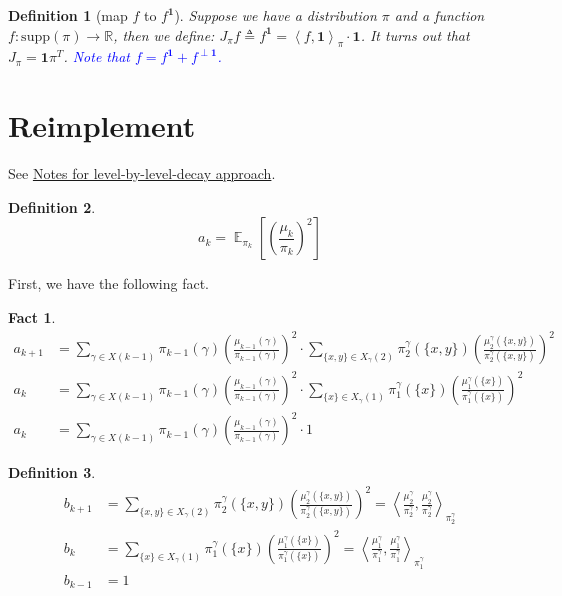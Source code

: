 \documentclass{article}
\newtheorem{define}{Definition}[section]
\newtheorem{fact}{Fact}[section]
\DeclareMathOperator*{\E}{\mathbb{E}}
\def\<{\left\langle}
\def\>{\right\rangle}
\begin{document}
\begin{define}[map $f$ to $f^{\mathbf{1}}$]
  Suppose we have a distribution $\pi$ and a function $f: \mathrm{supp}(\pi) \to \mathbb{R}$, then we define:
  $J_\pi f \triangleq f^{\mathbf{1}} = \<f, \mathbf{1}\>_\pi \cdot \mathbf{1}$. It turns out that $J_\pi = \mathbf{1}\pi^T$. \textcolor{blue}{Note that $f = f^{\mathbf{1}} + f^{\perp \mathbf{1}}$.}
\end{define}

\section{Reimplement \cite{alev2020improved}}

See \href{run:../rapid-mixing-on-matroid-basis/note.pdf}{Notes for level-by-level-decay approach}.

\begin{define}
  \[a_k = \E_{\pi_k} \left[\left(\frac{\mu_k}{\pi_k}\right)^2\right]\]
\end{define}

First, we have the following fact.
\begin{fact}
  \begin{align*}
    a_{k+1} &= \sum_{\gamma\in X(k-1)} \pi_{k-1}(\gamma) (\frac{\mu_{k-1}(\gamma)}{\pi_{k-1}(\gamma)})^2\cdot \sum_{\{x,y\}\in X_\gamma(2)} \pi_2^\gamma (\{x,y\}) (\frac{\mu_2^\gamma(\{x,y\})}{\pi_2^\gamma(\{x,y\})})^2 \\
    a_{k} &= \sum_{\gamma\in X(k-1)} \pi_{k-1}(\gamma) (\frac{\mu_{k-1}(\gamma)}{\pi_{k-1}(\gamma)})^2\cdot \sum_{\{x\}\in X_\gamma(1)} \pi_1^\gamma (\{x\}) (\frac{\mu_1^\gamma(\{x\})}{\pi_1^\gamma(\{x\})})^2 \\
    a_{k} &= \sum_{\gamma\in X(k-1)} \pi_{k-1}(\gamma) (\frac{\mu_{k-1}(\gamma)}{\pi_{k-1}(\gamma)})^2 \cdot 1
  \end{align*}
\end{fact}

\begin{define}
  \begin{align*}
    b_{k+1} &= \sum_{\{x,y\}\in X_\gamma(2)} \pi_2^\gamma (\{x,y\}) (\frac{\mu_2^\gamma(\{x,y\})}{\pi_2^\gamma(\{x,y\})})^2 = \<\frac{\mu_2^\gamma}{\pi_2^\gamma}, \frac{\mu_2^\gamma}{\pi_2^\gamma}\>_{\pi_2^\gamma}\\
    b_k &= \sum_{\{x\}\in X_\gamma(1)} \pi_1^\gamma (\{x\}) (\frac{\mu_1^\gamma(\{x\})}{\pi_1^\gamma(\{x\})})^2 = \<\frac{\mu_1^\gamma}{\pi_1^\gamma}, \frac{\mu_1^\gamma}{\pi_1^\gamma}\>_{\pi_1^\gamma} \\
    b_{k-1} &= 1
  \end{align*}
\end{define}
\end{document}
